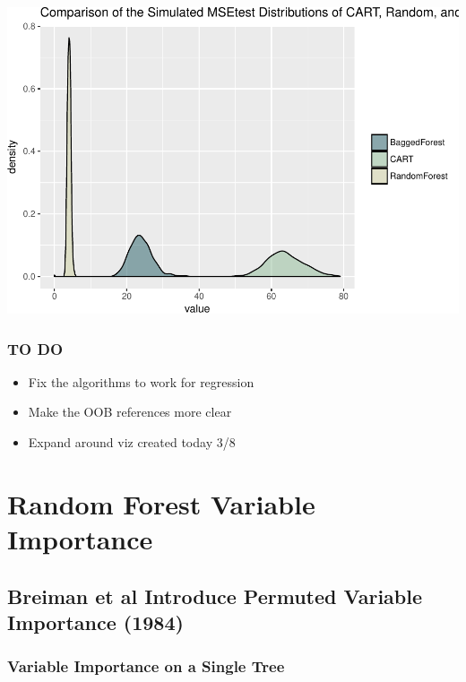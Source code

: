 \documentclass[12pt,twoside]{reedthesis}
\providecommand{\tightlist}{%
  \setlength{\itemsep}{0pt}\setlength{\parskip}{0pt}}
\begin{document}
  \begin{center}\includegraphics{Thesis_files/figure-latex/fig12-1} \end{center}
  
  \subsection{TO DO}\label{to-do}
  
  \begin{itemize}
  \tightlist
  \item
    Fix the algorithms to work for regression
  \item
    Make the OOB references more clear
  \item
    Expand around viz created today 3/8
  \end{itemize}
  
  \chapter{Random Forest Variable
  Importance}\label{random-forest-variable-importance}
  
  \section{Breiman et al Introduce Permuted Variable Importance
  (1984)}\label{breiman-et-al-introduce-permuted-variable-importance-1984}
  
  \subsection{Variable Importance on a Single
  Tree}\label{variable-importance-on-a-single-tree}
  
\end{document}
